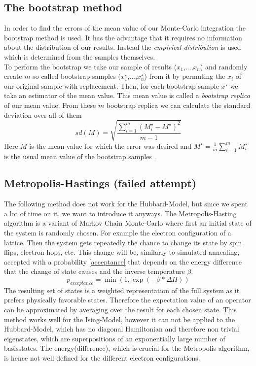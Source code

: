 
\subsection{The bootstrap method}
In order to find the errors of the mean value of our Monte-Carlo integration the bootstrap method is used. It has the advantage that it requires no information about the distribution of our results. Instead the \textit{empirical distribution} is used which is determined from the samples themselves. \\
To perform the bootstrap we take our sample of results ($x_1$,...,$x_n$) and randomly create $m$ so called bootstrap samples ($x^{\star}_1$,...,$x^{\star}_n$) from it by permuting the $x_i$ of our original sample with replacement. Then, for each bootstrap sample $x^{\star}$ we take an estimator of the mean value. This mean value is called a \textit{bootstrap replica} of our mean value. From these $m$ bootstrap replica we can calculate the standard deviation over all of them
\begin{equation}
	sd(M)=\sqrt{\frac{\sum_{i=1}^{m}(M^{\star}_i-M^{\star})^2}{m-1}} \label{bootstraperror}
\end{equation}  
Here $M$ is the mean value for which the error was desired and $M^{\star}=\frac{1}{m}\sum_{i=1}^{m}M^{\star}_i$ is the usual mean value of the bootstrap samples \cite{computational}.
	
\subsection{Metropolis-Hastings (failed attempt)}
The following method does not work for the Hubbard-Model, but since we spent a lot of time on it, we want to introduce it anyways.
The Metropolis-Hasting algorithm is a variant of Markov Chain Monte-Carlo where first an initial state of the system is randomly chosen.
For example the electron configuration of a lattice. Then the system gets repeatedly the chance to change its state by spin flips, electron hops, etc. This change will be, similarly to simulated annealing, accepted with a probability \eqref{acceptance} that depends on the energy difference that the change of state causes and the inverse temperature $\beta$.
\begin{equation}\label{acceptance}
p_{acceptance} = \min(1,\exp(-\beta*\Delta H))
\end{equation}
The resulting set of states is a weighted representation of the full system as it prefers physically favorable states.
Therefore the expectation value of an operator can be approximated by averaging over the result for each chosen state.
This method works well for the Ising-Model, however it can not be applied to the Hubbard-Model, which has no diagonal Hamiltonian and therefore non trivial eigenstates, which are superpositions of an exponentially large number of basisstates.
The energy(difference), which is crucial for the Metropolis algorithm, is hence not well defined for the different electron configurations.